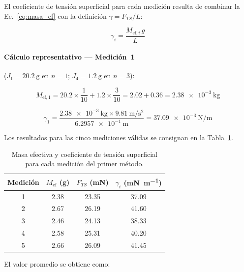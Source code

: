El coeficiente de tensión superficial para cada medición resulta de
combinar la Ec.~\eqref{eq:masa_ef} con la definición
$\gamma = F_{TS}/L$:

\begin{equation}
    \gamma_i = \frac{M_{\text{ef},i}\,g}{L}
    \label{eq:t9_gamma_m1}
\end{equation}

\paragraph{Cálculo representativo — Medición~1}
($J_1 = \qty{20.2}{\gram}$ en $n = 1$;\;
 $J_4 = \qty{1.2}{\gram}$  en $n = 3$):

\begin{equation*}
    M_{\text{ef},1}
    = \num{20.2} \times \frac{1}{10} + \num{1.2} \times \frac{3}{10}
    = \num{2.02} + \num{0.36}
    = \qty{2.38e-3}{\kilogram}
\end{equation*}

\begin{equation*}
    \gamma_1
    = \frac{\qty{2.38e-3}{\kilogram}
            \times \qty{9.81}{\meter\per\second\squared}}
           {\qty{6.2957e-1}{\meter}}
    = \qty{37.09e-3}{\newton\per\meter}
\end{equation*}

Los resultados para las cinco mediciones válidas se consignan en la
Tabla~\ref{tab:t9_gamma_m1}.

\begin{table}[htbp]
\centering
\caption{Masa efectiva y coeficiente de tensión superficial para cada
medición del primer método.}
\label{tab:t9_gamma_m1}
\begin{tabular}{cccc}
\toprule
Medición &
$M_{\text{ef}}$ (\si{\gram}) &
$F_{TS}$ (\si{\milli\newton}) &
$\gamma_i$ (\si{\milli\newton\per\meter}) \\
\midrule
1 & \num{2.38} & \num{23.35} & \num{37.09} \\
2 & \num{2.67} & \num{26.19} & \num{41.60} \\
3 & \num{2.46} & \num{24.13} & \num{38.33} \\
4 & \num{2.58} & \num{25.31} & \num{40.20} \\
5 & \num{2.66} & \num{26.09} & \num{41.45} \\
\bottomrule
\end{tabular}
\end{table}

El valor promedio se obtiene como:

